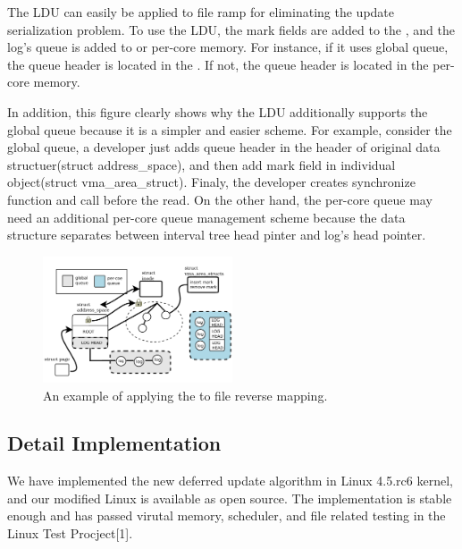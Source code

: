 The LDU can easily be applied to file ramp for eliminating the update
serialization problem.
To use the LDU, the mark fields are added to the , and the log's queue is added to  or per-core
memory.
For instance, if it uses global queue, the queue header is located in the
. If not, the queue header is located in the
per-core memory.

In addition, this figure clearly shows why the LDU additionally supports the
global queue because it is a simpler and easier scheme.
For example, consider the global queue, a developer just adds queue header in
the header of original data structuer(struct address\_space), and then add mark
field in individual object(struct vma\_area\_struct).
Finaly, the developer creates synchronize function and call before the
read.
On the other hand, the per-core queue may need an additional per-core
queue management scheme because the data structure separates between interval
tree head pinter and log's head pointer.

\begin{figure}[tb]
  \begin{center}
     \includegraphics[width=0.5\textwidth,height=0.5\textheight,keepaspectratio]{fig/file_rmap}
  \end{center}
  \caption{An example of applying the  to file reverse mapping. }
  \label{fig:fileramp}
\end{figure}

\subsection{Detail Implementation}\label{sec:implementation}

We have implemented the new deferred update algorithm in Linux 4.5.rc6 kernel,
and our modified Linux is available as open source. 
The implementation is stable enough and has passed virutal memory, scheduler,
and file related testing in the Linux Test Procject[1].


